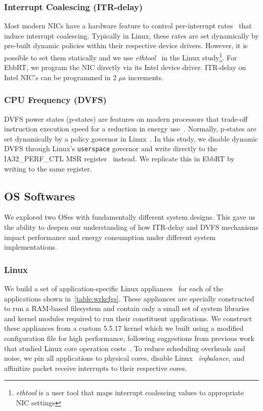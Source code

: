 \subsubsection{Interrupt Coalescing (ITR-delay)}
Most modern NICs have a hardware feature to control per-interrupt rates~\cite{intelitr, mellanoxsinterrupt} that induce interrupt coalescing. Typically in Linux, these rates are set dynamically by pre-built dynamic policies within their respective device drivers. However, it is possible to set them statically and we use \textit{ethtool}~\cite{intelethtool} in the Linux study\footnote{\textit{ethtool} is a user tool that maps interrupt coalescing values to appropriate NIC settings}. For EbbRT, we program the NIC directly via its Intel device driver. ITR-delay on Intel NIC's can be programmed in 2 $\mu$s increments.

\subsubsection{CPU Frequency (DVFS)}
DVFS power states (p-states) are features on modern processors that trade-off instruction execution speed for a reduction in energy use~\cite{armdvfs, amdpstate, intel_manual}. Normally, p-states are set dynamically by a policy governor in Linux~\cite{cpufreq_governor}. In this study, we disable dynamic DVFS through Linux's \texttt{userspace} governor and write directly to the IA32\_PERF\_CTL MSR register~\cite{intel_msr} instead. We replicate this in EbbRT by writing to the same register.

\subsection{OS Softwares}
\label{sec:OS}
We explored two OSes with fundamentally different system designs. This gave us the ability to deepen our understanding of how ITR-delay and DVFS mechanisms impact performance and energy consumption under different system implementations.

\subsubsection{Linux}
We build a set of application-specific Linux appliances~\cite{271072, hanappliance} for each of the applications shown in~\cref{table:wrkcfgs}. These appliances are specially constructed to run a RAM-based filesystem and contain only a small set of system libraries and kernel modules required to run their constituent applications. We construct these appliances from a custom 5.5.17 kernel which we built using a modified configuration file for high performance, following suggestions from previous work that studied Linux core operation costs~\cite{linux-core-ops}. To reduce scheduling overheads and noise, we pin all applications to physical cores, disable Linux ~\textit{irqbalance}, and affinitize packet receive interrupts to their respective cores.

